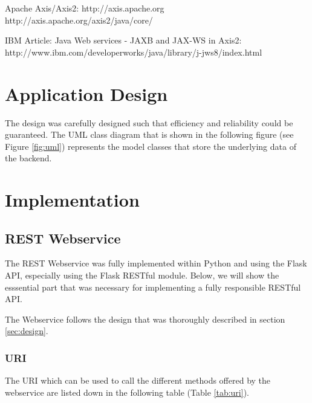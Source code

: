 \documentclass[11pt, a4paper]{article}
\begin{document}
Apache Axis/Axis2: http://axis.apache.org http://axis.apache.org/axis2/java/core/

IBM Article: Java Web services - JAXB and JAX-WS in Axis2:
http://www.ibm.com/developerworks/java/library/j-jws8/index.html

\section{Application Design}

The design was carefully designed such that efficiency and reliability could be
guaranteed. The UML class diagram that is shown in the following figure (see
Figure \ref{fig:uml}) represents the model classes that store the underlying
data of the backend. 


\section{Implementation}

\subsection{REST Webservice}

The REST Webservice was fully implemented within Python and using the Flask API,
especially using the Flask RESTful module. Below, we will show the esssential
part that was necessary for implementing a fully responsible RESTful API.  

The Webservice follows the design that was thoroughly described in section
\ref{sec:design}.

\subsubsection{URI}

The URI which can be used to call the different methods offered by the
webservice are listed down in the following table (Table \ref{tab:uri}).
\end{document}
